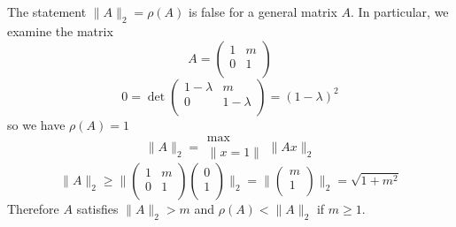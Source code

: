 \documentclass[11pt]{article} %
\begin{document}
\subsection{} %
The statement  $\|A \|_2 = \rho(A)$ is false for a general matrix $A$. In particular, we examine the matrix
\begin{equation}
A = \left ( \begin{array}{rr}
1 &m \\
0 & 1 \\
\end{array} \right )
\end{equation}
\begin{equation}
0=\det \left ( \begin{array}{rr}
1-\lambda &m \\
0 & 1-\lambda \\
\end{array} \right ) = (1-\lambda)^2
\end{equation}
so we have $\rho(A)  =1$
\begin{equation}
\| A \|_2 = \substack{\max \\ \|x =1\|} \|A x \|_2
\end{equation}
\begin{equation}
\| A \|_2 \ge \| \left ( \begin{array}{rr}
1 &m \\
0 & 1 \\
\end{array} \right )\left ( \begin{array}{r}
0 \\
1\\
\end{array} \right )\|_2 = \| \left ( \begin{array}{r}
m \\
1\\
\end{array} \right )\|_2 = \sqrt{1+m^2}
\end{equation}
Therefore $A$ satisfies $\| A\|_2 > m$ and $\rho(A) < \|A\|_2$ if $m\ge1$.
\end{document}
